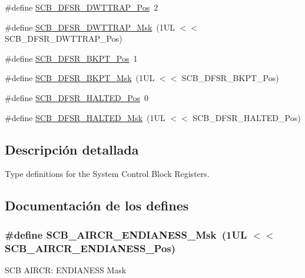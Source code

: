 \begin{DoxyCompactItemize}
\item 
\#define \hyperlink{group___c_m_s_i_s___s_c_b_gaccf82364c6d0ed7206f1084277b7cc61}{S\+C\+B\+\_\+\+D\+F\+S\+R\+\_\+\+D\+W\+T\+T\+R\+A\+P\+\_\+\+Pos}~2
\item 
\#define \hyperlink{group___c_m_s_i_s___s_c_b_ga3f7384b8a761704655fd45396a305663}{S\+C\+B\+\_\+\+D\+F\+S\+R\+\_\+\+D\+W\+T\+T\+R\+A\+P\+\_\+\+Msk}~(1\+U\+L $<$$<$ S\+C\+B\+\_\+\+D\+F\+S\+R\+\_\+\+D\+W\+T\+T\+R\+A\+P\+\_\+\+Pos)
\item 
\#define \hyperlink{group___c_m_s_i_s___s_c_b_gaf28fdce48655f0dcefb383aebf26b050}{S\+C\+B\+\_\+\+D\+F\+S\+R\+\_\+\+B\+K\+P\+T\+\_\+\+Pos}~1
\item 
\#define \hyperlink{group___c_m_s_i_s___s_c_b_ga609edf8f50bc49adb51ae28bcecefe1f}{S\+C\+B\+\_\+\+D\+F\+S\+R\+\_\+\+B\+K\+P\+T\+\_\+\+Msk}~(1\+U\+L $<$$<$ S\+C\+B\+\_\+\+D\+F\+S\+R\+\_\+\+B\+K\+P\+T\+\_\+\+Pos)
\item 
\#define \hyperlink{group___c_m_s_i_s___s_c_b_gaef4ec28427f9f88ac70a13ae4e541378}{S\+C\+B\+\_\+\+D\+F\+S\+R\+\_\+\+H\+A\+L\+T\+E\+D\+\_\+\+Pos}~0
\item 
\#define \hyperlink{group___c_m_s_i_s___s_c_b_ga200bcf918d57443b5e29e8ce552e4bdf}{S\+C\+B\+\_\+\+D\+F\+S\+R\+\_\+\+H\+A\+L\+T\+E\+D\+\_\+\+Msk}~(1\+U\+L $<$$<$ S\+C\+B\+\_\+\+D\+F\+S\+R\+\_\+\+H\+A\+L\+T\+E\+D\+\_\+\+Pos)
\end{DoxyCompactItemize}


\subsection{Descripción detallada}
Type definitions for the System Control Block Registers. 



\subsection{Documentación de los \textquotesingle{}defines\textquotesingle{}}
\subsubsection[{\texorpdfstring{S\+C\+B\+\_\+\+A\+I\+R\+C\+R\+\_\+\+E\+N\+D\+I\+A\+N\+E\+S\+S\+\_\+\+Msk}{SCB_AIRCR_ENDIANESS_Msk}}]{\setlength{\rightskip}{0pt plus 5cm}\#define S\+C\+B\+\_\+\+A\+I\+R\+C\+R\+\_\+\+E\+N\+D\+I\+A\+N\+E\+S\+S\+\_\+\+Msk~(1\+U\+L $<$$<$ S\+C\+B\+\_\+\+A\+I\+R\+C\+R\+\_\+\+E\+N\+D\+I\+A\+N\+E\+S\+S\+\_\+\+Pos)}\hypertarget{group___c_m_s_i_s___s_c_b_ga2f571f93d3d4a6eac9a3040756d3d951}{}\label{group___c_m_s_i_s___s_c_b_ga2f571f93d3d4a6eac9a3040756d3d951}
S\+CB A\+I\+R\+CR\+: E\+N\+D\+I\+A\+N\+E\+SS Mask 

